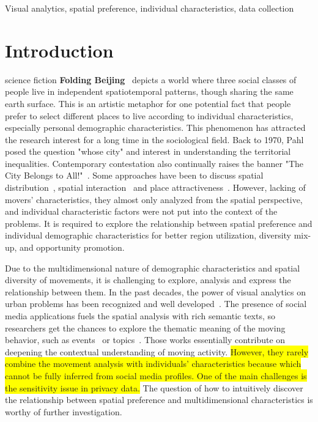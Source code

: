 \documentclass{ieeeaccess}
\begin{document}
\begin{keywords}
Visual analytics, spatial preference, individual characteristics, data collection
\end{keywords}

\titlepgskip=-15pt

\maketitle

\section{Introduction}
\label{sec:introduction}
 science fiction \textbf{Folding Beijing}~\cite{hao2016_foldingbeijing} depicts a world where three social classes of people live in independent spatiotemporal patterns, though sharing the same earth surface. This is an artistic metaphor for one potential fact that people prefer to select different places to live according to individual characteristics, especially personal demographic characteristics. This phenomenon has attracted the research interest for a long time in the sociological field. Back to 1970, Pahl~\cite{pahl1975whose} posed the question "whose city" and interest in understanding the territorial inequalities. Contemporary contestation also continually raises the banner "The City Belongs to All!"~\cite{Mayer2017_whosecity}. Some approaches have been to discuss spatial distribution~\cite{RN909}, spatial interaction~\cite{RN1692} and place attractiveness~\cite{retailcity}. However, lacking of movers' characteristics, they almost only analyzed from the spatial perspective, and individual characteristic factors were not put into the context of the problems. It is required to explore the relationship between spatial preference and individual demographic characteristics for better region utilization, diversity mix-up, and opportunity promotion.

Due to the multidimensional nature of demographic characteristics and spatial diversity of movements, it is challenging to explore, analysis and express the relationship between them. In the past decades, the power of visual analytics on urban problems has been recognized and well developed~\cite{wang2013visual, zeng2013visualizing}. The presence of social media applications fuels the spatial analysis with rich semantic texts, so researchers get the chances to explore the thematic meaning of the moving behavior, such as events~\cite{chen2017map} or topics~\cite{bosch2013scatterblogs2}. Those works essentially contribute on deepening the contextual understanding of moving activity. \colorbox{yellow}{However, they rarely combine the movement analysis with individuals' characteristics because which cannot be fully inferred from social media profiles. One of the main challenges is the sensitivity issue in privacy data.}
The question of how to intuitively discover the relationship between spatial preference and multidimensional characteristics is worthy of further investigation. 
\end{document}
